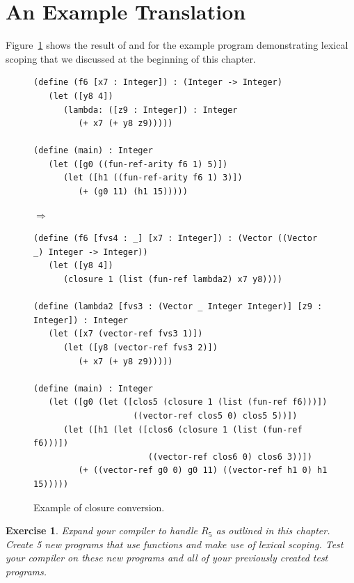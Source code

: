\documentclass[11pt]{book}
\newtheorem{exercise}[theorem]{Exercise}
\begin{document}
\section{An Example Translation}
\label{sec:example-lambda}

Figure~\ref{fig:lexical-functions-example} shows the result of
 and  for the example
program demonstrating lexical scoping that we discussed at the
beginning of this chapter.


\begin{figure}[tbp]
  \begin{minipage}{0.8\textwidth}
\begin{lstlisting}[basicstyle=\ttfamily\footnotesize]
(define (f6 [x7 : Integer]) : (Integer -> Integer)
   (let ([y8 4])
      (lambda: ([z9 : Integer]) : Integer
         (+ x7 (+ y8 z9)))))

(define (main) : Integer
   (let ([g0 ((fun-ref-arity f6 1) 5)])
      (let ([h1 ((fun-ref-arity f6 1) 3)])
         (+ (g0 11) (h1 15)))))
\end{lstlisting}
$\Rightarrow$
\begin{lstlisting}[basicstyle=\ttfamily\footnotesize]
(define (f6 [fvs4 : _] [x7 : Integer]) : (Vector ((Vector _) Integer -> Integer))
   (let ([y8 4])
      (closure 1 (list (fun-ref lambda2) x7 y8))))

(define (lambda2 [fvs3 : (Vector _ Integer Integer)] [z9 : Integer]) : Integer
   (let ([x7 (vector-ref fvs3 1)])
      (let ([y8 (vector-ref fvs3 2)])
         (+ x7 (+ y8 z9)))))

(define (main) : Integer
   (let ([g0 (let ([clos5 (closure 1 (list (fun-ref f6)))])
                    ((vector-ref clos5 0) clos5 5))])
      (let ([h1 (let ([clos6 (closure 1 (list (fun-ref f6)))])
                       ((vector-ref clos6 0) clos6 3))])
         (+ ((vector-ref g0 0) g0 11) ((vector-ref h1 0) h1 15)))))
\end{lstlisting}
\end{minipage}

\caption{Example of closure conversion.}
\label{fig:lexical-functions-example}
\end{figure}

\begin{exercise}\normalfont
Expand your compiler to handle $R_5$ as outlined in this chapter.
Create 5 new programs that use  functions and make use of
lexical scoping. Test your compiler on these new programs and all of
your previously created test programs.
\end{exercise}
\end{document}
